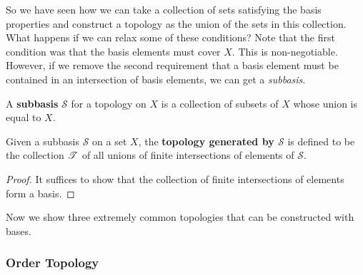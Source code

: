   So we have seen how we can take a collection of sets satisfying the basis properties and construct a topology as the union of the sets in this collection. What happens if we can relax some of these conditions? Note that the first condition was that the basis elements must cover $X$. This is non-negotiable. However, if we remove the second requirement that a basis element must be contained in an intersection of basis elements, we can get a \textit{subbasis}. 

  \begin{definition}[Subbasis]
    A \textbf{subbasis} $\mathscr{S}$ for a topology on $X$ is a collection of subsets of $X$ whose union is equal to $X$. 
  \end{definition}

  \begin{theorem}
    Given a subbasis $\mathscr{S}$ on a set $X$, the \textbf{topology generated by $\mathscr{S}$} is defined to be the collection $\T$ of all unions of finite intersections of elements of $\mathscr{S}$. 
  \end{theorem}
  \begin{proof}
    It suffices to show that the collection of finite intersections of elements form a basis. 
  \end{proof}

  Now we show three extremely common topologies that can be constructed with bases. 

\subsubsection{Order Topology}

